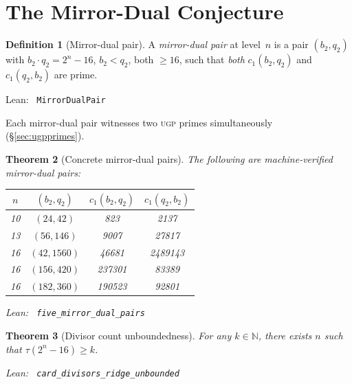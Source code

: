 \documentclass[11pt,a4paper]{article}
\newenvironment{leanref}%
  {\par\smallskip\noindent\begingroup\raggedright\textup{Lean:}~}%
  {\par\endgroup}
\newtheorem{theorem}{Theorem}[section]
\theoremstyle{definition}
\newtheorem{definition}[theorem]{Definition}
\newcommand{\ugp}{\textsc{ugp}}
\newcommand{\N}{\mathbb{N}}
\begin{document}
\section{The Mirror-Dual Conjecture}\label{sec:mirror}

\begin{definition}[Mirror-dual pair]\label{def:mirror-dual}
A \emph{mirror-dual pair} at level~$n$ is a pair $(b_2, q_2)$ with
$b_2 \cdot q_2 = 2^n - 16$, $b_2 < q_2$, both $\ge 16$, such that
\emph{both} $c_1(b_2, q_2)$ and $c_1(q_2, b_2)$ are prime.

\begin{leanref} \lstinline|MirrorDualPair|
\end{leanref}
\end{definition}

Each mirror-dual pair witnesses two \ugp{} primes simultaneously
(\S\ref{sec:ugpprimes}).

\begin{theorem}[Concrete mirror-dual pairs]\label{thm:mirror-concrete}
The following are machine-verified mirror-dual pairs:
\begin{center}
\begin{tabular}{@{}cccc@{}}
\toprule
$n$ & $(b_2, q_2)$ & $c_1(b_2,q_2)$ & $c_1(q_2,b_2)$ \\
\midrule
10 & $(24, 42)$   & 823  & 2137 \\
13 & $(56, 146)$  & 9007 & 27817 \\
16 & $(42, 1560)$ & 46681 & 2489143 \\
16 & $(156, 420)$ & 237301 & 83389 \\
16 & $(182, 360)$ & 190523 & 92801 \\
\bottomrule
\end{tabular}
\end{center}

\begin{leanref} \lstinline|five_mirror_dual_pairs|
\end{leanref}
\end{theorem}

\begin{theorem}[Divisor count unboundedness]\label{thm:tau-unbounded}
For any $k \in \N$, there exists $n$ such that
$\tau(2^n - 16) \ge k$.

\begin{leanref} \lstinline|card_divisors_ridge_unbounded|
\end{leanref}
\end{theorem}
\end{document}
